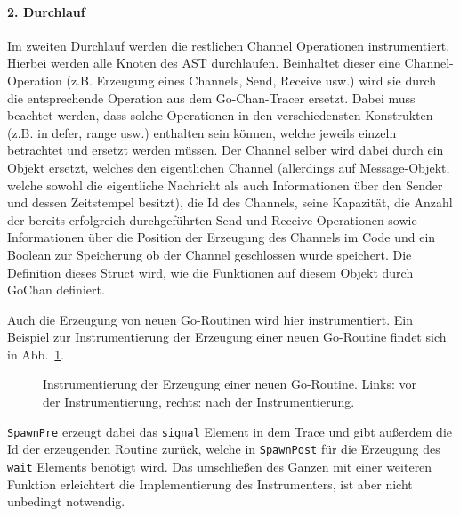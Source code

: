 \paragraph{2. Durchlauf} Im zweiten Durchlauf werden die restlichen 
Channel Operationen instrumentiert. Hierbei werden alle Knoten des 
AST durchlaufen. Beinhaltet dieser eine Channel-Operation (z.B. Erzeugung 
eines Channels, Send, Receive usw.) wird sie durch die entsprechende 
Operation aus dem Go-Chan-Tracer ersetzt. Dabei muss beachtet werden,
dass solche Operationen in den verschiedensten Konstrukten (z.B. in defer, 
range usw.) enthalten sein können, welche jeweils einzeln betrachtet und 
ersetzt werden müssen. Der Channel selber wird dabei durch ein Objekt ersetzt, 
welches den eigentlichen Channel (allerdings auf Message-Objekt, welche 
sowohl die eigentliche Nachricht als auch Informationen über den Sender und 
dessen Zeitstempel besitzt), die Id des Channels, seine Kapazität, 
die Anzahl der bereits erfolgreich durchgeführten Send und Receive Operationen
sowie Informationen über die Position der Erzeugung des Channels im Code
und ein Boolean zur Speicherung ob der Channel geschlossen wurde
speichert. Die Definition dieses Struct wird, wie die Funktionen auf diesem 
Objekt durch GoChan definiert.

Auch die Erzeugung von neuen Go-Routinen 
wird hier instrumentiert. Ein Beispiel zur Instrumentierung der Erzeugung einer 
neuen Go-Routine findet sich in Abb.~\ref{Chap:Instrumenter-Sec:Instrumenter-Fig:GoRoutine}.
\begin{figure}[h!]
  \begin{minipage}[t]{0.3\textwidth}
    
  \end{minipage}
  \begin{minipage}[t]{0.65\textwidth}
    
  \end{minipage}
  \caption{Instrumentierung der Erzeugung einer neuen Go-Routine. Links: vor der 
    Instrumentierung, rechts: nach der Instrumentierung.}
  \label{Chap:Instrumenter-Sec:Instrumenter-Fig:GoRoutine}
\end{figure}
\texttt{SpawnPre} erzeugt dabei das \texttt{signal} Element in dem Trace 
und gibt außerdem die Id der erzeugenden Routine zurück, welche in \texttt{SpawnPost}
für die Erzeugung des \texttt{wait} Elements benötigt wird. Das umschließen 
des Ganzen mit einer weiteren Funktion erleichtert die Implementierung 
des Instrumenters, ist aber nicht unbedingt notwendig.

